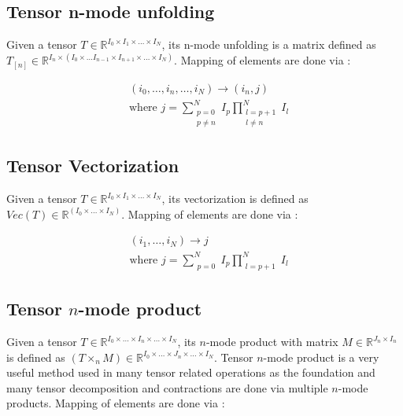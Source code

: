 \documentclass[runningheads]{llncs}
\begin{document}
\subsection{Tensor n-mode unfolding}
\label{subsec:tensor-unfolding}
Given a tensor 
$T\in \mathbb{R}^{I_0\times I_1\times \dots \times I_N}$,
its n-mode unfolding is a matrix defined
\linebreak 
as $T_{\left[n\right]} \in \mathbb{R}^{I_n \times \left(I_0\times \dots I_{n-1}\times I_{n+1}\times \dots \times I_N\right)}$. Mapping of elements are done via :

\begin{align}
	\label{eq:unfolding}
	&(i_0, \dots, i_n,\dots,i_N) \longrightarrow (i_n,j)\\
	&\text{where } j = \sum_{\substack{p=0 \\ p\neq n}}^{N} I_p \prod_{\substack{l=p+1 \\ l\neq n}}^{N} I_l
\end{align}

\subsection{Tensor Vectorization}
\label{subsec:tensor-vectorization}
Given a tensor 
$T\in \mathbb{R}^{I_0\times I_1\times \dots \times I_N}$, its vectorization is defined as $Vec(T) \in \mathbb{R}^{(I_0\times \dots \times I_N)}$. Mapping of elements are done via :

\begin{align}
	\label{eq:vectorization}
	&(i_1,\dots,i_N) \longrightarrow j\\
	&\text{where } j = \sum_{\substack{p=0}}^{N} I_p \prod_{\substack{l=p+1}}^{N} I_l
\end{align}

\subsection{Tensor $n$-mode product}
\label{subsec:tensor-nmode-product}
Given a tensor 
$T\in \mathbb{R}^{I_0\times \dots\times I_n \times \dots \times I_N}$, its $n$-mode product with matrix
\linebreak
 $M \in \mathbb{R}^{J_n \times I_n}$ is defined as $ (T \times_n M) \in \mathbb{R}^{I_0\times \dots\times J_n \times \dots \times I_N}$. Tensor $n$-mode product is a very useful method used in many tensor related operations as the foundation and many tensor decomposition and contractions are done via multiple $n$-mode products. Mapping of elements are done via : 
 
\end{document}
